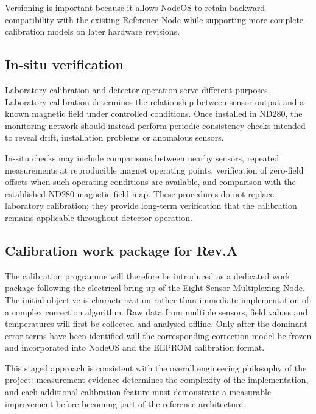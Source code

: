 Versioning is important because it allows NodeOS to retain backward compatibility with the existing Reference Node while supporting more complete calibration models on later hardware revisions.

\subsection{In-situ verification}

Laboratory calibration and detector operation serve different purposes. Laboratory calibration determines the relationship between sensor output and a known magnetic field under controlled conditions. Once installed in ND280, the monitoring network should instead perform periodic consistency checks intended to reveal drift, installation problems or anomalous sensors.

In-situ checks may include comparisons between nearby sensors, repeated measurements at reproducible magnet operating points, verification of zero-field offsets when such operating conditions are available, and comparison with the established ND280 magnetic-field map. These procedures do not replace laboratory calibration; they provide long-term verification that the calibration remains applicable throughout detector operation.

\subsection{Calibration work package for Rev.A}

The calibration programme will therefore be introduced as a dedicated work package following the electrical bring-up of the Eight-Sensor Multiplexing Node. The initial objective is characterization rather than immediate implementation of a complex correction algorithm. Raw data from multiple sensors, field values and temperatures will first be collected and analysed offline. Only after the dominant error terms have been identified will the corresponding correction model be frozen and incorporated into NodeOS and the EEPROM calibration format.

This staged approach is consistent with the overall engineering philosophy of the project: measurement evidence determines the complexity of the implementation, and each additional calibration feature must demonstrate a measurable improvement before becoming part of the reference architecture.
